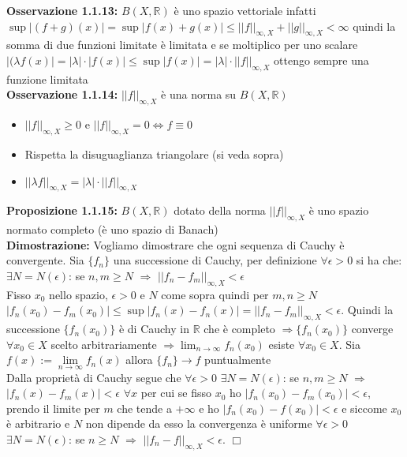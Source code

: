 \documentclass[a4paper,11pt,titlepage]{book}
\begin{document}
\textbf{Osservazione 1.1.13:} $B(X,\mathbb{R})$ è uno spazio vettoriale infatti $\sup |(f+g)(x)|=\sup |f(x)+g(x)|\leq ||f||_{\infty,X}+||g||_{\infty,X}<\infty$ quindi la somma di due funzioni limitate è limitata e se moltiplico per uno scalare $|(\lambda f(x)|=|\lambda |\cdot |f(x)|\leq \sup |f(x)|=|\lambda | \cdot ||f||_{\infty,X}$ ottengo sempre una funzione limitata\\

\textbf{Osservazione 1.1.14:} $||f||_{\infty,X}$ è una norma su $B(X,\mathbb{R})$
\begin{itemize}
\item $||f||_{\infty,X}\geq 0$ e $||f||_{\infty,X}=0\Leftrightarrow f\equiv 0$
\item Rispetta la disuguaglianza triangolare (si veda sopra)
\item $||\lambda f||_{\infty,X}=|\lambda |\cdot ||f||_{\infty,X}$ \\
\end{itemize}

\textbf{Proposizione 1.1.15:} $B(X,\mathbb{R})$ dotato della norma $||f||_{\infty,X}$ è uno spazio normato completo (è uno spazio di Banach) \\

\textbf{Dimostrazione:} Vogliamo dimostrare che ogni sequenza di Cauchy è convergente. Sia $\{f_{n}\}$ una successione di Cauchy, per definizione $\forall{\epsilon}>0$ si ha che: $\exists{N}=N(\epsilon)$: se $n,m\geq{N}$ $\Rightarrow$ $||f_{n}-f_{m}||_{\infty,X}<\epsilon$\\

Fisso $x_0$ nello spazio, $\epsilon >0$ e $ N $ come sopra quindi per $m,n \geq N$ $|f_{n}(x_0)-f_{m}(x_0)|\leq \sup|f_{n}(x)-f_{n}(x)|=||f_{n}-f_{m}||_{\infty,X}<\epsilon$. Quindi la successione $\{f_{n}(x_0)\}$ è di Cauchy in $\mathbb{R}$ che è completo $\Rightarrow\{f_{n}(x_0)\}$  converge $\forall{x_{0}}\in{X}$ scelto arbitrariamente  $\Rightarrow \lim_{n \to \infty}f_{n}(x_0)$ esiste $\forall{x_{0}}\in{X}$. Sia $f(x):=\lim\limits_{n \to \infty}{f_{n}}(x)$ allora $\{f_{n}\}\rightarrow f$ puntualmente\\

Dalla proprietà di Cauchy segue che $\forall{\epsilon}>0$ $\exists{N}=N(\epsilon)$: se $n,m\geq{N}$ $\Rightarrow$ $|f_{n}(x)-f_{m}(x)|<\epsilon$  $\forall{x}$ per cui se fisso $x_0$ ho $|f_{n}(x_0)-f_{m}(x_0)|<\epsilon$, prendo il limite per $m$ che tende a $+\infty$ e ho $|f_{n}(x_0)-f(x_0)|<\epsilon$ e siccome $x_0$ è arbitrario e $N$ non dipende da esso la convergenza è uniforme $\forall{\epsilon{>0}}$ $\exists{N}=N(\epsilon)$: se $n\geq{N}$ $\Rightarrow$ $||f_{n}-f||_{\infty,X}<\epsilon$. $\Box$\\
\end{document}
